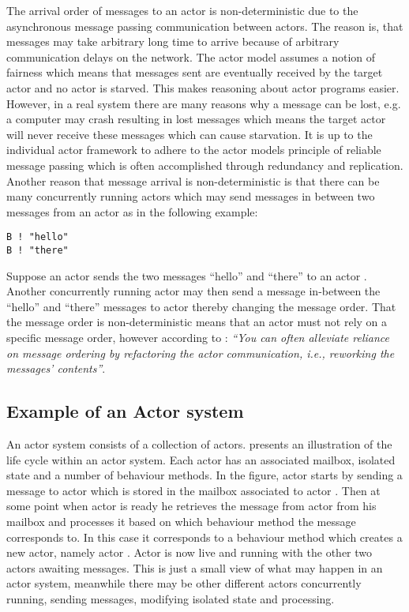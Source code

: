 The arrival order of messages to an actor is non-deterministic due to the asynchronous message passing communication between actors\cite[p. 2]{karmani2011actors}. The reason is, that messages may take arbitrary long time to arrive because of arbitrary communication delays on the network. The actor model assumes a notion of fairness which means that messages sent are eventually received by the target actor and no actor is starved\cite[Chap. 2.5]{haller2012actors}\cite[p. 3]{karmani2009actor}. This makes reasoning about actor programs easier\cite{tasharofi2013scala}. However, in a real system there are many reasons why a message can be lost, e.g. a computer may crash resulting in lost messages which means the target actor will never receive these messages which can cause starvation. It is up to the individual actor framework to adhere to the actor models principle of reliable message passing which is often accomplished through redundancy and replication\cite[Chap. 2.5]{haller2012actors}. Another reason that message arrival is non-deterministic is that there can be many concurrently running actors which may send messages in between two messages from an actor as in the following example:
\begin{verbatim}
B ! "hello"
B ! "there"
\end{verbatim}
Suppose an actor  sends the two messages ``hello'' and ``there'' to an actor . Another concurrently running actor  may then send a message in-between the ``hello'' and ``there'' messages to actor  thereby changing the message order. That the message order is non-deterministic means that an actor must not rely on a specific message order, however according to \cite[p. 35]{haller2012actors}: \textit{``You can often alleviate reliance on message ordering by refactoring the actor communication, i.e., reworking the messages' contents''}.

\subsection{Example of an Actor system}
An actor system consists of a collection of actors.  presents an illustration of the life cycle within an actor system. Each actor has an associated mailbox, isolated state and a number of behaviour methods. In the figure, actor  starts by sending a message to actor  which is stored in the mailbox associated to actor . Then at some point when actor  is ready he retrieves the message from actor  from his mailbox and processes it based on which behaviour method the message corresponds to. In this case it corresponds to a behaviour method which creates a new actor, namely actor . Actor  is now live and running with the other two actors awaiting messages. This is just a small view of what may happen in an actor system, meanwhile there may be other different actors concurrently running, sending messages, modifying isolated state and processing.

